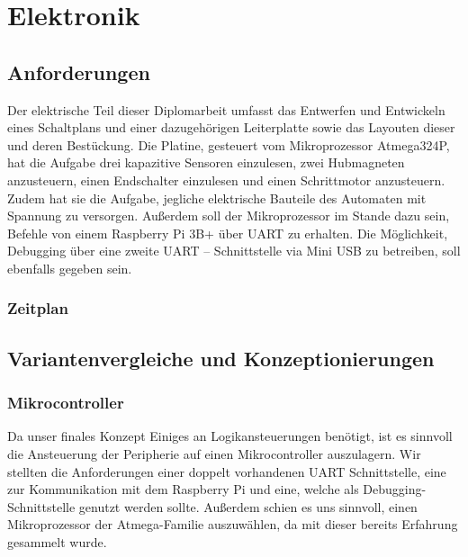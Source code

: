 \chapter{Elektronik}


\section{Anforderungen}

Der elektrische Teil dieser Diplomarbeit umfasst das Entwerfen und Entwickeln eines Schaltplans und einer dazugehörigen Leiterplatte sowie das Layouten dieser und deren Bestückung.
Die Platine, gesteuert vom Mikroprozessor Atmega324P, hat die Aufgabe drei kapazitive Sensoren einzulesen, zwei Hubmagneten anzusteuern, einen Endschalter einzulesen und einen Schrittmotor anzusteuern.
Zudem hat sie die Aufgabe, jegliche elektrische Bauteile des Automaten mit Spannung zu versorgen.
Außerdem soll der Mikroprozessor im Stande dazu sein, Befehle von einem Raspberry Pi 3B+ über UART zu erhalten.
Die Möglichkeit, Debugging über eine zweite UART – Schnittstelle via Mini USB zu betreiben, soll ebenfalls gegeben sein.

\subsection{Zeitplan}

\newpage

\section{Variantenvergleiche und Konzeptionierungen}
\subsection{Mikrocontroller}
Da unser finales Konzept Einiges an Logikansteuerungen benötigt, ist es sinnvoll die Ansteuerung der Peripherie auf einen Mikrocontroller auszulagern.
Wir stellten die Anforderungen einer doppelt vorhandenen UART Schnittstelle, eine zur Kommunikation mit dem Raspberry Pi und eine, welche als Debugging-Schnittstelle genutzt werden sollte.
Außerdem schien es uns sinnvoll, einen Mikroprozessor der Atmega-Familie auszuwählen, da mit dieser bereits Erfahrung gesammelt wurde.
